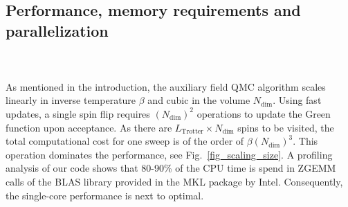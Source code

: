 \subsection{Performance, memory requirements and parallelization} \label{sec:performance}

\\ \\

As mentioned in the  introduction, the auxiliary field QMC algorithm scales linearly in inverse temperature $\beta$ and cubic in the volume $N_{\text{dim}}$. Using fast updates,  a single spin flip  requires $(N_{\text{dim}})^2$ operations to update the Green function upon acceptance.  As there are $L_{\text{Trotter}}\times N_{\text{dim}}$ spins to be visited, the total computational cost for one sweep is of the order of $\beta (N_{\text{dim}})^3$. This operation  dominates the performance, see Fig.~\ref{fig_scaling_size}. A profiling analysis of our code shows that 80-90\% of the CPU time is spend in ZGEMM calls of the BLAS library provided in the MKL package by Intel. Consequently, the single-core performance is next to optimal.

